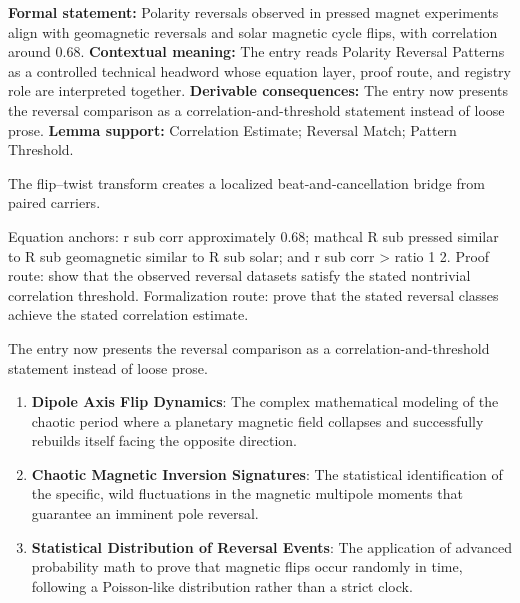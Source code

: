 \begingroup\footnotesize\setlength{\emergencystretch}{3em}\sloppy
\textbf{Formal statement:} Polarity reversals observed in pressed magnet experiments align with geomagnetic reversals and solar magnetic cycle flips, with correlation around 0.68. \textbf{Contextual meaning:} The entry reads Polarity Reversal Patterns as a controlled technical headword whose equation layer, proof route, and registry role are interpreted together. \textbf{Derivable consequences:} The entry now presents the reversal comparison as a correlation-and-threshold statement instead of loose prose. \textbf{Lemma support:} Correlation Estimate; Reversal Match; Pattern Threshold.\par
\endgroup

The flip--twist transform creates a localized beat-and-cancellation bridge from paired carriers.

Equation anchors: r sub corr approximately 0.68; mathcal R sub pressed similar to R sub geomagnetic similar to R sub solar; and r sub corr > ratio 1 2. Proof route: show that the observed reversal datasets satisfy the stated nontrivial correlation threshold. Formalization route: prove that the stated reversal classes achieve the stated correlation estimate.

The entry now presents the reversal comparison as a correlation-and-threshold statement instead of loose prose.
\endgroup

\begin{enumerate}[leftmargin=1.6em,itemsep=6pt,topsep=4pt]
\item \textbf{Dipole Axis Flip Dynamics}: The complex mathematical modeling of the chaotic period where a planetary magnetic field collapses and successfully rebuilds itself facing the opposite direction.
\item \textbf{Chaotic Magnetic Inversion Signatures}: The statistical identification of the specific, wild fluctuations in the magnetic multipole moments that guarantee an imminent pole reversal.
\item \textbf{Statistical Distribution of Reversal Events}: The application of advanced probability math to prove that magnetic flips occur randomly in time, following a Poisson-like distribution rather than a strict clock.
\end{enumerate}

